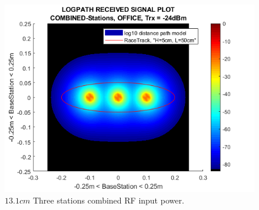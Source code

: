\begin{figure}[h]
	\centering
	\includegraphics[width=1\linewidth]{theory/pathLoss/fig/logpathReceivedSignal_combinedStations_office_lowSignal.png}
	\caption{$13.1cm$ Three stations combined RF input power.}
	\label{fig:logpathReceivedSignal_combinedStations_office_lowSignal}
\end{figure}
